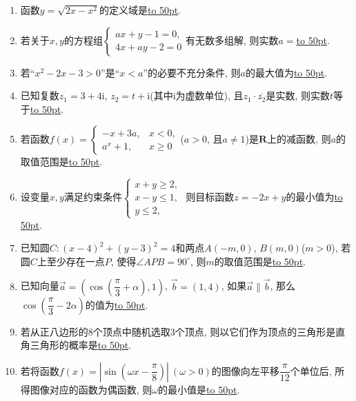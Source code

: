\documentclass[10pt,a4paper]{article}
\newcommand{\blank}[1]{\underline{\hbox to #1pt{}}}
\begin{document}
\begin{enumerate}[1.]

\item 函数$y=\sqrt{2x-x^2}$的定义域是\blank{50}.  
\item 若关于$x,y$的方程组$\begin{cases} ax+y-1=0,  \\ 4x+ay-2=0  \end{cases}$有无数多组解, 则实数$a=$\blank{50}.
\item 若``$x^2-2x-3>0$''是``$x<a$''的必要不充分条件, 则$a$的最大值为\blank{50}.
\item 已知复数$z_1=3+4\mathrm{i}$, $z_2=t+\mathrm{i}$(其中$\mathrm{i}$为虚数单位), 且$z_1\cdot \overline{z_2}$是实数, 则实数$t$等于\blank{50}.  
\item 若函数$f(x)=\begin{cases} -x+3a, & x<0,  \\ a^x+1, & x\ge 0 \end{cases}$($a>0$, 且$a\ne 1$)是$\mathbf{R}$上的减函数, 则$a$的取值范围是\blank{50}.
\item 设变量$x,y$满足约束条件$\begin{cases} x+y\ge 2, \\ x-y\le 1, \\ y\le 2,\end{cases}$ 则目标函数$z=-2x+y$的最小值为\blank{50}.
\item 已知圆$C:(x-4)^2+(y-3)^2=4$和两点$A(-m,0)$, $B(m,0)$($m>0$), 若圆$C$上至少存在一点$P$, 使得$\angle APB=90^\circ $, 则$m$的取值范围是\blank{50}.  
\item 已知向量$\overrightarrow a=(\cos(\dfrac{\pi}3+\alpha),1)$, $\overrightarrow b=(1,4)$, 如果$\overrightarrow a \parallel \overrightarrow b$, 那么$\cos(\dfrac{\pi}3-2\alpha)$的值为\blank{50}.
\item 若从正八边形的$8$个顶点中随机选取$3$个顶点, 则以它们作为顶点的三角形是直角三角形的概率是\blank{50}.  
\item 若将函数$f(x)=|\sin(\omega x-\dfrac{\pi}8)| \ (\omega >0)$的图像向左平移$\dfrac{\pi}{12}$个单位后, 所得图像对应的函数为偶函数, 则$\omega$的最小值是\blank{50}.



\end{enumerate}
\end{document}
